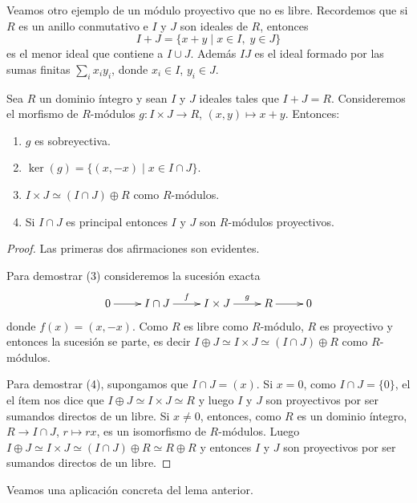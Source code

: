 Veamos otro ejemplo de un módulo proyectivo que no es libre. Recordemos
que si $R$ es un anillo conmutativo e $I$ y $J$ son ideales de $R$, entonces
	\[
		I+J=\{x+y\mid x\in I,\;y\in J\}
	\]
es el menor ideal que contiene a $I\cup J$. Además $IJ$ es el ideal formado
por las sumas finitas $\sum_i x_iy_i$, donde $x_i\in I$, $y_i\in J$. 

	\begin{lemma}
		Sea $R$ un dominio íntegro y sean $I$ y $J$ ideales tales que
		$I+J=R$. Consideremos el morfismo de $R$-módulos 
		$g\colon I\times J\to R$, $(x,y)\mapsto x+y$. 
		Entonces:
		\begin{enumerate}
			\item $g$ es sobreyectiva.
			\item $\ker(g)=\{(x,-x)\mid x\in I\cap J\}$.
			\item $I\times J\simeq (I\cap J)\oplus R$ como $R$-módulos.
			\item Si $I\cap J$ es principal entonces $I$ y $J$ son $R$-módulos
				proyectivos.
		\end{enumerate}
	\end{lemma}

	\begin{proof}
		Las primeras dos afirmaciones son evidentes. 
		
		Para demostrar (3) consideremos la sucesión exacta
		\[
		\xymatrix{
		0\ar[r] 
		& I\cap J
		\ar[r]^-{f}
		& I\times J
		\ar[r]^-{g}
		& R\ar[r]
		& 0
		}
		\]
		donde $f(x)=(x,-x)$. Como $R$ es libre como $R$-módulo, $R$ es proyectivo 
		y entonces la sucesión se parte, es decir $I\oplus J\simeq 
		I\times J\simeq (I\cap J)\oplus R$
		como $R$-módulos. 
		
		Para demostrar (4), supongamos que $I\cap
		J=(x)$. Si $x=0$, como $I\cap J=\{0\}$, el 
		el ítem nos dice que $I\oplus J\simeq I\times J\simeq R$ y 
		luego $I$ y $J$ son proyectivos por ser sumandos directos de un libre.  
		Si $x\ne 0$, entonces, como $R$ es un dominio íntegro, $R\to I\cap J$, $r\mapsto rx$, es un isomorfismo de
		$R$-módulos. Luego 
		$I\oplus J\simeq I\times J\simeq (I\cap J)\oplus R\simeq R\oplus R$ y entonces 
		$I$ y $J$ son proyectivos por ser sumandos directos de
		un libre.
	\end{proof}

Veamos una aplicación concreta del lema anterior.  

